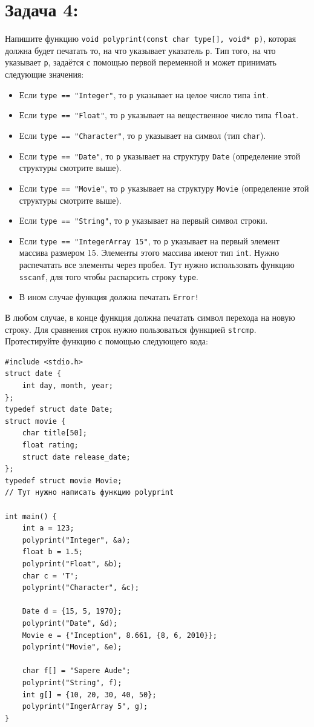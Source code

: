 \documentclass{article}
\begin{document}
\newpage
\section*{Задача 4:}
Напишите функцию \texttt{void polyprint(const char type[], void* p)}, которая должна будет печатать то, на что указывает указатель \texttt{p}. Тип того, на что указывает \texttt{p}, задаётся с помощью первой переменной и может принимать следующие значения:
\begin{itemize}
\item Если \texttt{type == "Integer"}, то \texttt{p} указывает на целое число типа \texttt{int}.
\item Если \texttt{type == "Float"}, то \texttt{p} указывает на вещественное число типа \texttt{float}.
\item Если \texttt{type == "Character"}, то \texttt{p} указывает на символ (тип \texttt{char}).
\item Если \texttt{type == "Date"}, то \texttt{p} указывает на структуру \texttt{Date} (определение этой структуры смотрите выше).
\item Если \texttt{type == "Movie"}, то \texttt{p} указывает на структуру \texttt{Movie} (определение этой структуры смотрите выше).
\item Если \texttt{type == "String"}, то \texttt{p} указывает на первый символ строки.
\item Если \texttt{type == "IntegerArray 15"}, то \texttt{p} указывает на первый элемент массива размером 15. Элементы этого массива имеют тип \texttt{int}. Нужно распечатать все элементы через пробел. Тут нужно использовать функцию \texttt{sscanf}, для того чтобы распарсить строку \texttt{type}.
\item В ином случае функция должна печатать \texttt{Error!}
\end{itemize}
В любом случае, в конце функция должна печатать символ перехода на новую строку. Для сравнения строк нужно пользоваться функцией \texttt{strcmp}. Протестируйте функцию с помощью следующего кода:

\begin{lstlisting}
#include <stdio.h>
struct date {
    int day, month, year;
};
typedef struct date Date;
struct movie {
    char title[50];
    float rating;
    struct date release_date;
};
typedef struct movie Movie;
// Тут нужно написать функцию polyprint

int main() {
    int a = 123;
    polyprint("Integer", &a);
    float b = 1.5;
    polyprint("Float", &b);
    char c = 'T';
    polyprint("Character", &c);
    
    Date d = {15, 5, 1970};
    polyprint("Date", &d);
    Movie e = {"Inception", 8.661, {8, 6, 2010}};
    polyprint("Movie", &e);
    
    char f[] = "Sapere Aude";
    polyprint("String", f);
    int g[] = {10, 20, 30, 40, 50};
    polyprint("IngerArray 5", g);
}
\end{lstlisting}
\end{document}
